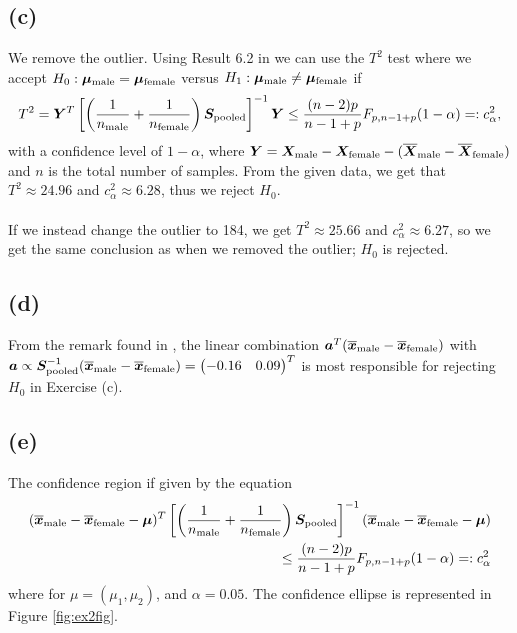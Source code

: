 \subsection*{(c)}
\label{sec:c-1}
We remove the outlier.
 Using Result 6.2 in \cite[p. 286]{book} we can use the $T^{2}$ test
 where we accept $H_{0}:\bm{\mu}_{\rm male} = \bm{\mu}_{\rm female}$ versus
 $H_{1}:\bm{\mu}_{\rm male} \neq \bm{\mu}_{\rm female}$ if 
\begin{equation*}
T^{2} = \bm{Y}^{T}
\left[
  \left(
    \frac{1}{n_{\rm male}} + \frac{1}{n_{\rm female}}
  \right)
  \bm{S}_{\rm pooled}
\right]^{-1} \bm{Y}
\leq \frac{(n-2)p}{n-1+p}F_{p, n-1+p}(1-\alpha) =:c^{2}_{\alpha},
\end{equation*}
with a confidence level of $1-\alpha$, where $\bm{Y} = \bm{X}_{\rm male}- \bm{X}_{\rm female} - (\overline{\bm{X}}_{\rm male}- \overline{\bm{X}}_{\rm female} )$ and $n$ is the total number of samples. From the given data, we get that
 $T^{2}\approx 24.96 $
and $c^{2}_{\alpha} \approx 6.28$, thus we reject $H_{0}$. \\
\\
If we instead change the outlier to 184, we get $T^{2} \approx 25.66$ and
$c_{\alpha}^{2} \approx  6.27$, so we get the same conclusion as when
we removed the outlier; $H_{0}$ is rejected.
\subsection*{(d)}
 From the remark found in \cite[p. 289]{book}, the linear combination
 $\bm{a}^{T} (\overline{\bm{x}}_{\rm male} - \overline{\bm{x}}_{\rm female})$ with $\bm{a}
 \propto \bm{S}_{\rm pooled}^{-1}(\overline{\bm{x}}_{\rm male} - \overline{\bm{x}}_{\rm
   female}) =
 \begin{pmatrix}
   -0.16 &0.09
 \end{pmatrix}^{T}
$ is most responsible for rejecting $H_{0}$ in Exercise (c). 
\subsection*{(e)}
\label{sec:e}

The confidence region if given by the equation
\begin{align}
  \label{eq:ex2-conf-region}
 (\overline{\bm{x}}_{\rm male}  - \overline{\bm{x}}_{\rm female} - \bm{\mu})^{T}
\left[
  \left(
    \frac{1}{n_{\rm male}} + \frac{1}{n_{\rm female}}
  \right)
  \bm{S}_{\rm pooled}
\right]^{-1} (\overline{\bm{x}}_{\rm male}  - \overline{\bm{x}}_{\rm female} - \bm{\mu}) \nonumber
\\
\leq \frac{(n-2)p}{n-1+p}F_{p, n-1+p}(1-\alpha) =:c^{2}_{\alpha}
\end{align}
where for $\mu = (\mu_1, \mu_2)$, and $\alpha = 0.05$. The confidence
ellipse is represented in Figure \ref{fig:ex2fig}.

